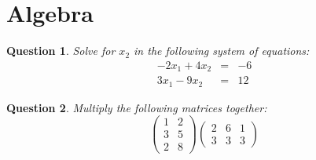 \documentclass[13pt,a4paper]{article}
\newtheorem{question}{Question}
\begin{document}




\section{Algebra}

\begin{question}

Solve for $x_2$ in the following system of equations:
\begin{eqnarray*}
-2x_1 + 4x_2 & = &-6\\
3x_1  - 9x_2 & = & 12 
\end{eqnarray*}
\vspace*{13pt}
\end{question}


\begin{question}
Multiply the following matrices together:
\[ \left( \begin{array}{cc}
1 & 2 \\
3 & 5 \\
2 & 8
\end{array} \right)
%
\left( \begin{array}{ccc}
2 & 6 & 1 \\
3 & 3 & 3
\end{array} \right)
\]
\end{question}
\end{document}
